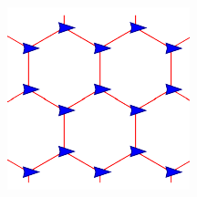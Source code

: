 \begin{columns}[T] %
  \begin{column}{.45\textwidth}
    
  \end{column}%
  \begin{column}{.45\textwidth}
    \begin{figure}
      \centering
      \includegraphics[width=0.5\columnwidth]{figs/hexagonlattice}
    \end{figure}
  \end{column}%
\end{columns}